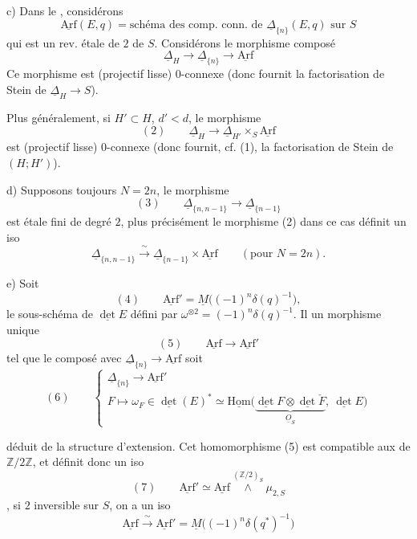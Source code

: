 \documentclass[11pt,a4paper]{article}
\begin{document}
c) Dans le  , considérons
\[
\underline{\mathrm{Arf}}(E,q) = \text{schéma des comp. conn. de } \underline{\Delta}_{\{n\}}(E,q) \text{ sur } S
\]
qui est un rev. étale de  $2$ de $S$.
Considérons  le  morphisme composé
\[
\underline{\Delta}_H \longrightarrow \underline{\Delta}_{\{n\}} \longrightarrow \underline{\mathrm{Arf}}
\]
 Ce morphisme est
(projectif lisse) $0$-connexe (donc fournit la factorisation de Stein de
$\underline{\Delta}_H\to S$).

Plus généralement, si $H'\subset H$, $d'<d$, le morphisme
\[
(2)\qquad \underline{\Delta}_H \longrightarrow \underline{\Delta}_{H'}\times_S \underline{\mathrm{Arf}}
\]
est (projectif lisse) $0$-connexe (donc fournit, cf. (1), la factorisation de
Stein de $(H;H')$).

d) Supposons toujours $N=2n$, le morphisme
\[
(3)\qquad \underline{\Delta}_{\{n,n-1\}} \longrightarrow \underline{\Delta}_{\{n-1\}}
\]
est étale fini de degré $2$, plus précisément le 
morphisme (2) dans ce cas définit un iso
\[
\underline{\Delta}_{\{n,n-1\}} \xrightarrow{\ \sim\ } \underline{\Delta}_{\{n-1\}}\times \underline{\mathrm{Arf}}
\qquad (\text{pour } N=2n).
\]

e) Soit \struck{\ill{}}
\[
(4)\qquad \underline{\mathrm{Arf}}' = \underline{M}\bigl((-1)^n\delta(q)^{-1}\bigr),
\]
le sous-schéma de $\underline{\det} E$ défini par
$\omega^{\otimes 2}=(-1)^n\delta(q)^{-1}$. Il   un
morphisme unique
\[
(5)\qquad \underline{\mathrm{Arf}} \longrightarrow \underline{\mathrm{Arf}}'
\]
tel que le composé avec $\underline{\Delta}_{\{n\}}\to\underline{\mathrm{Arf}}$ soit
\[
(6)\qquad
\begin{cases}
\underline{\Delta}_{\{n\}} \longrightarrow \underline{\mathrm{Arf}}' \\
F \longmapsto \omega_F \in \underline{\det}(E)^{*} \simeq \underline{\mathrm{Hom}}\bigl(\underbrace{\underline{\det} F\otimes\underline{\det}\check F}_{\underline{O}_S},\ \underline{\det} E\bigr)
\end{cases}
\]

déduit de la structure d'extension. Cet homomorphisme (5) est compatible aux
 de $\mathbb{Z}/2\mathbb{Z}$, et définit donc un iso
\[
(7)\qquad \underline{\mathrm{Arf}}' \simeq \underline{\mathrm{Arf}} \overset{(\mathbb{Z}/2)_S}{\wedge} \mu_{2,S}
\]
, si $2$ inversible sur $S$, on a un iso
\[
\underline{\mathrm{Arf}} \xrightarrow{\ \sim\ } \underline{\mathrm{Arf}}' = \underline{M}\bigl((-1)^n\delta(q^{*})^{-1}\bigr)
\]
\end{document}
